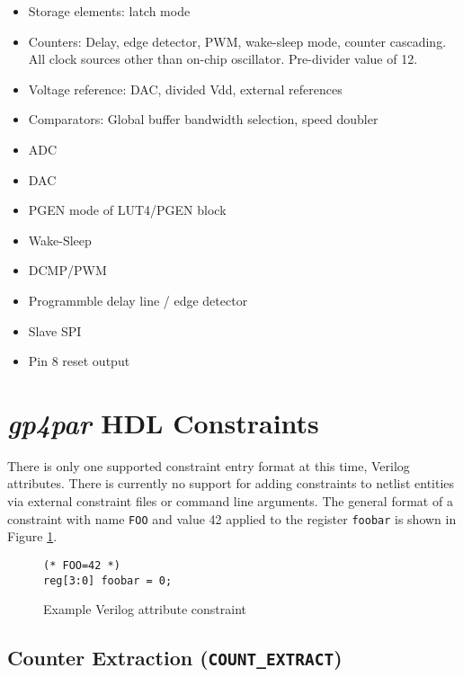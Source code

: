 \documentclass[11pt]{article}
\newcommand{\namestyle}[1]{\textit{#1}}
\newcommand{\tokenstyle}[1]{\texttt{#1}}
\newcommand{\wirestyle}[1]{\texttt{#1}}
\begin{document}
\begin{itemize}
\item Storage elements: latch mode
\item Counters: Delay, edge detector, PWM, wake-sleep mode, counter cascading.
All clock sources other than on-chip oscillator. Pre-divider value of 12.
\item Voltage reference: DAC, divided Vdd, external references
\item Comparators: Global buffer bandwidth selection, speed doubler
\item ADC
\item DAC
\item PGEN mode of LUT4/PGEN block
\item Wake-Sleep
\item DCMP/PWM
\item Programmble delay line / edge detector
\item Slave SPI
\item Pin 8 reset output
\end{itemize}

\pagebreak
\section{\namestyle{gp4par} HDL Constraints}

There is only one supported constraint entry format at this time, Verilog attributes. There is currently no support for
adding constraints to netlist entities via external constraint files or command line arguments. The general format of a
constraint with name \tokenstyle{FOO} and value 42 applied to the register \wirestyle{foobar} is shown in Figure
\ref{constraint}.

\begin{figure}[h]
\begin{lstlisting}
(* FOO=42 *)
reg[3:0] foobar = 0;
\end{lstlisting}
\caption{Example Verilog attribute constraint}
\label{constraint}
\end{figure}


\pagebreak
\subsection{Counter Extraction (\tokenstyle{COUNT\_EXTRACT})}
\label{count-extract}
\end{document}
